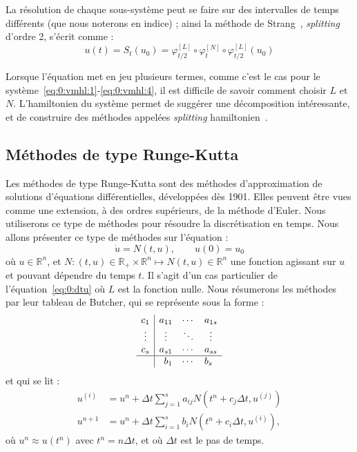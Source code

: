 La résolution de chaque sous-système peut se faire sur des intervalles de temps différents (que nous noterons en indice) ; ainsi la méthode de Strang~\cite{Strang:1968}, \emph{splitting} d'ordre 2, s'écrit comme :
$$
  u(t) = S_{t}(u_0) = \varphi^{[L]}_{t/2}\circ\varphi^{[N]}_{t}\circ\varphi^{[L]}_{t/2}(u_0)
$$

Lorsque l'équation met en jeu plusieurs termes, comme c'est le cas pour le système~\eqref{eq:0:vmhl:1}-\eqref{eq:0:vmhl:4}, il est difficile de savoir comment choisir $L$ et $N$. L'hamiltonien du système permet de suggérer une décomposition intéressante, et de construire des méthodes appelées \emph{splitting} hamiltonien~\cite{Crouseilles:2015,Casas:2017,Bernier:2020,Li:2019}.


\subsection{Méthodes de type Runge-Kutta}

Les méthodes de type Runge-Kutta sont des méthodes d'approximation de solutions d'équations différentielles, développées dès 1901. Elles peuvent être vues comme une extension, à des ordres supérieurs, de la méthode d'Euler. Nous utiliserons ce type de méthodes pour résoudre la discrétisation en temps. Nous allons présenter ce type de méthodes sur l'équation :
$$
  \dot{u} = N(t,u),\qquad u(0)=u_0
$$
où $u\in\mathbb{R}^n$, et $N:(t,u)\in\mathbb{R}_+\times\mathbb{R}^n\mapsto N(t,u)\in\mathbb{R}^n$ une fonction agissant sur $u$ et pouvant dépendre du temps $t$. Il s'agit d'un cas particulier de l'équation~\eqref{eq:0:dtu} où $L$ est la fonction nulle. Nous résumerons les méthodes par leur tableau de Butcher\cite{Butcher:2008}, qui se représente sous la forme :
\begin{equation}  
  \begin{array}{c|c}
    \begin{matrix}
      c_1 \\
      \vdots \\
      c_s
    \end{matrix}
    &
    \begin{matrix}
      a_{11} & \cdots & a_{1s} \\
      \vdots & \ddots & \vdots \\
      a_{s1} & \cdots & a_{ss}
    \end{matrix} \\
    \hline
     & \begin{matrix} b_1 & \cdots & b_s \end{matrix} \\
  \end{array}
  \label{eq:0:butcher}
\end{equation}
et qui se lit :
$$
  \begin{aligned}
    u^{(i)} &= u^n + \Delta t \sum_{j=1}^s a_{ij} N(t^n+c_j\Delta t,u^{(j)}) \\
    u^{n+1} &= u^n + \Delta t \sum_{i=1}^s b_i N(t^n+c_i\Delta t, u^{(i)}),
  \end{aligned}
$$
où $u^n\approx u(t^n)$ avec $t^n=n\Delta t$, et où $\Delta t$ est le pas de temps.

